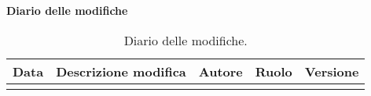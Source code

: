 \textbf{\Large Diario delle modifiche}
\vspace{0.5cm}
\small
\begin{longtable}{|c|m{4cm}|>{\centering}m{2.7cm}|c|c|}
\hline 
\textbf{Data} & \textbf{Descrizione modifica} & \textbf{Autore} & \textbf{Ruolo} & \textbf{Versione}\\ \hline \endhead

\caption{Diario delle modifiche.}
\label{tabella:diarioModifiche}
\end{longtable}
\clearpage
